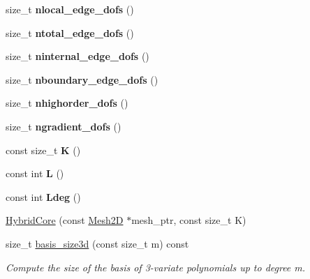 \begin{DoxyCompactItemize}
size\+\_\+t {\bfseries nlocal\+\_\+edge\+\_\+dofs} ()
\item 
\mbox{\label{classMeshFramework2D_1_1HybridCore_abbd33967c9ff866d55a62455889f7beb}} 
size\+\_\+t {\bfseries ntotal\+\_\+edge\+\_\+dofs} ()
\item 
\mbox{\label{classMeshFramework2D_1_1HybridCore_af381ad55b32c332f2013d99f92f2b000}} 
size\+\_\+t {\bfseries ninternal\+\_\+edge\+\_\+dofs} ()
\item 
\mbox{\label{classMeshFramework2D_1_1HybridCore_a8de4eff94635021ab179080a290d1463}} 
size\+\_\+t {\bfseries nboundary\+\_\+edge\+\_\+dofs} ()
\item 
\mbox{\label{classMeshFramework2D_1_1HybridCore_af2a545403074f28fa17f2c688f0a6665}} 
size\+\_\+t {\bfseries nhighorder\+\_\+dofs} ()
\item 
\mbox{\label{classMeshFramework2D_1_1HybridCore_a0aefff14bebce4ebfe24da4b2f6e71a2}} 
size\+\_\+t {\bfseries ngradient\+\_\+dofs} ()
\item 
\mbox{\label{classMeshFramework2D_1_1HybridCore_ac5fe4668cae756f26a58eaea078ce18d}} 
const size\+\_\+t {\bfseries K} ()
\item 
\mbox{\label{classMeshFramework2D_1_1HybridCore_af05ae2cf70051bca8a8bf7f4af784097}} 
const int {\bfseries L} ()
\item 
\mbox{\label{classMeshFramework2D_1_1HybridCore_a48608b10abcde52a9b7a6a456ada76ab}} 
const int {\bfseries Ldeg} ()
\item 
\hyperlink{classMeshFramework2D_1_1HybridCore_a1be8b1438197223b63153ce4331fb656}{Hybrid\+Core} (const \hyperlink{classMeshFramework2D_1_1Mesh2D}{Mesh2D} $\ast$mesh\+\_\+ptr, const size\+\_\+t K)
\item 
size\+\_\+t \hyperlink{classMeshFramework2D_1_1HybridCore_a8ae6e62f18213ca052e181f09ae63556}{basis\+\_\+size3d} (const size\+\_\+t m) const
\begin{DoxyCompactList}\small\item\em Compute the size of the basis of 3-\/variate polynomials up to degree m. \end{DoxyCompactList}\item 

\end{DoxyCompactItemize}

